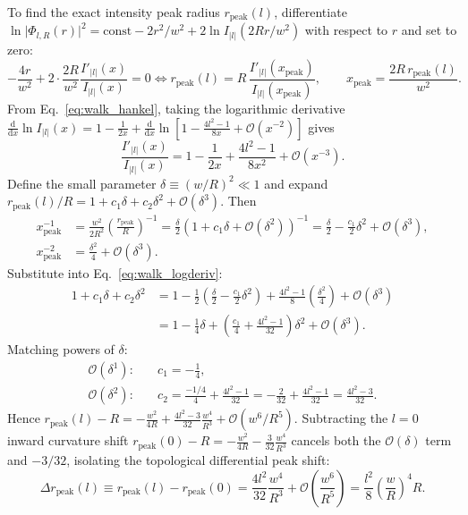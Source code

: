 \documentclass[10pt,letterpaper]{article}
\newcommand{\abs}[1]{\lvert #1 \rvert}
\newcommand{\dd}{\mathrm{d}}
\numberwithin{equation}{section}
\begin{document}
To find the exact intensity peak radius $r_{\mathrm{peak}}(l)$, differentiate $\ln\abs{\Phi_{l,R}(r)}^2 = \text{const} - 2r^2/w^2 + 2\ln I_{\abs{l}}(2Rr/w^2)$ with respect to $r$ and set to zero:
\begin{equation}
  -\frac{4r}{w^2} + 2\cdot\frac{2R}{w^2}\frac{I'_{\abs{l}}(x)}{I_{\abs{l}}(x)} = 0 \iff r_{\mathrm{peak}}(l) = R\,\frac{I'_{\abs{l}}(x_{\mathrm{peak}})}{I_{\abs{l}}(x_{\mathrm{peak}})}, \qquad x_{\mathrm{peak}} = \frac{2R\,r_{\mathrm{peak}}(l)}{w^2}.
  \label{eq:walk_transc}
\end{equation}
From Eq.~\eqref{eq:walk_hankel}, taking the logarithmic derivative $\frac{\dd}{\dd x}\ln I_{\abs{l}}(x) = 1 - \frac{1}{2x} + \frac{\dd}{\dd x}\ln\!\left[1 - \frac{4l^2-1}{8x} + \mathcal{O}(x^{-2})\right]$ gives
\begin{equation}
  \frac{I'_{\abs{l}}(x)}{I_{\abs{l}}(x)} = 1 - \frac{1}{2x} + \frac{4l^2 - 1}{8x^2} + \mathcal{O}(x^{-3}).
  \label{eq:walk_logderiv}
\end{equation}
Define the small parameter $\delta \equiv (w/R)^2 \ll 1$ and expand $r_{\mathrm{peak}}(l)/R = 1 + c_1\delta + c_2\delta^2 + \mathcal{O}(\delta^3)$. Then
\begin{align}
  x_{\mathrm{peak}}^{-1} &= \frac{w^2}{2R^2}\left(\frac{r_{\mathrm{peak}}}{R}\right)^{-1} = \frac{\delta}{2}\left(1 + c_1\delta + \mathcal{O}(\delta^2)\right)^{-1} = \frac{\delta}{2} - \frac{c_1}{2}\delta^2 + \mathcal{O}(\delta^3), \\
  x_{\mathrm{peak}}^{-2} &= \frac{\delta^2}{4} + \mathcal{O}(\delta^3).
\end{align}
Substitute into Eq.~\eqref{eq:walk_logderiv}:
\begin{align}
  1 + c_1\delta + c_2\delta^2 &= 1 - \frac{1}{2}\left(\frac{\delta}{2} - \frac{c_1}{2}\delta^2\right) + \frac{4l^2 - 1}{8}\left(\frac{\delta^2}{4}\right) + \mathcal{O}(\delta^3) \nonumber \\
  &= 1 - \frac{1}{4}\delta + \left(\frac{c_1}{4} + \frac{4l^2 - 1}{32}\right)\delta^2 + \mathcal{O}(\delta^3).
\end{align}
Matching powers of $\delta$:
\begin{align}
  \mathcal{O}(\delta^1): &\quad c_1 = -\frac{1}{4}, \\
  \mathcal{O}(\delta^2): &\quad c_2 = \frac{-1/4}{4} + \frac{4l^2 - 1}{32} = -\frac{2}{32} + \frac{4l^2 - 1}{32} = \frac{4l^2 - 3}{32}.
\end{align}
Hence $r_{\mathrm{peak}}(l) - R = -\frac{w^2}{4R} + \frac{4l^2-3}{32}\frac{w^4}{R^3} + \mathcal{O}(w^6/R^5)$. Subtracting the $l=0$ inward curvature shift $r_{\mathrm{peak}}(0) - R = -\frac{w^2}{4R} - \frac{3}{32}\frac{w^4}{R^3}$ cancels both the $\mathcal{O}(\delta)$ term and $-3/32$, isolating the topological differential peak shift:
\begin{equation}
  \Delta r_{\mathrm{peak}}(l) \equiv r_{\mathrm{peak}}(l) - r_{\mathrm{peak}}(0) = \frac{4l^2}{32}\frac{w^4}{R^3} + \mathcal{O}\!\left(\frac{w^6}{R^5}\right) = \frac{l^2}{8}\left(\frac{w}{R}\right)^4 R.
  \label{eq:walk_diffshift}
\end{equation}
\end{document}
